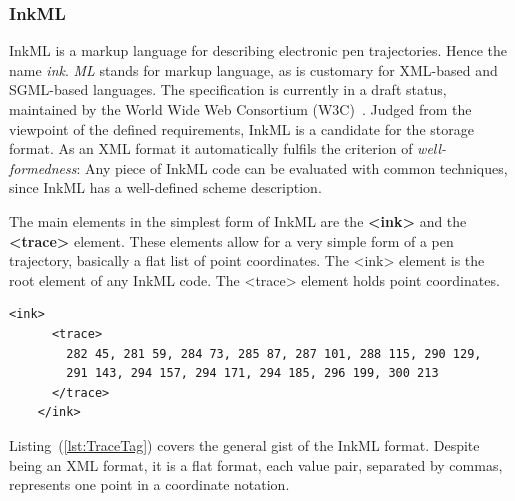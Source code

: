 \subsubsection{InkML}
\label{sec:hwre:inkml}

InkML is a markup language for describing electronic pen trajectories. 
Hence the name \emph{ink}. \emph{ML} stands for markup language, as is customary 
for XML-based and SGML-based languages. The specification is currently in a 
draft status, maintained by the World Wide Web Consortium 
(W3C)~. 
Judged from the viewpoint of the defined requirements, InkML is a candidate
for the storage format. As an XML format it automatically fulfils the
criterion of \emph{well-formedness}: Any piece of InkML code can be evaluated 
with common techniques, since InkML has a well-defined scheme description.

The main elements in the simplest form of InkML are the \textbf{<ink>} and 
the \textbf{<trace>} element. These elements allow for a very simple form 
of a pen trajectory, basically a flat list of point coordinates. The <ink> 
element is the root element of any InkML code. The <trace> element holds
point coordinates.
\begin{xmlcode}
  \begin{lstlisting}[emph={trace},emphstyle=\textbf,caption={Demonstration of the \emph{trace} tag},label=lst:TraceTag]
    <ink>
      <trace>
        282 45, 281 59, 284 73, 285 87, 287 101, 288 115, 290 129,
        291 143, 294 157, 294 171, 294 185, 296 199, 300 213
      </trace>
    </ink>
  \end{lstlisting}
\end{xmlcode}
Listing~(\ref{lst:TraceTag}) covers the general gist of the InkML format.
Despite being an XML format, it is a flat format, each value pair, 
separated by commas, represents one point in a coordinate notation.

